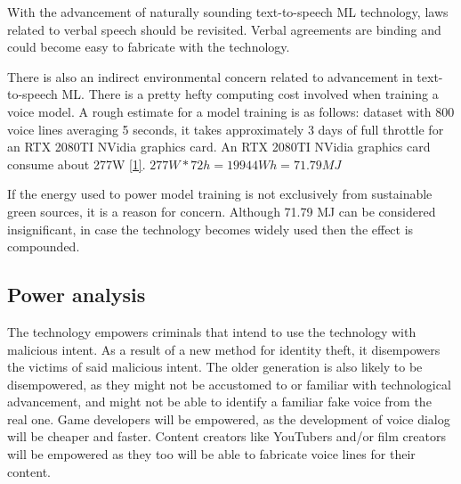 With the advancement of naturally sounding text-to-speech ML technology, laws related to verbal speech should be revisited.
Verbal agreements are binding and could become easy to fabricate with the technology.

There is also an indirect environmental concern related to advancement in text-to-speech ML. There is a pretty hefty computing cost involved when training a voice model. 
A rough estimate for a model training is as follows: dataset with 800 voice lines averaging 5 seconds, it takes approximately 3 days of full throttle for an RTX 2080TI NVidia graphics card. 
An RTX 2080TI NVidia graphics card consume about 277W \href{https://www.tomshardware.com/reviews/nvidia-geforce-rtx-2080-ti-founders-edition,5805-10.html}{[1]}.
$ 277W*72h = 19944 Wh = 71.79 MJ $

If the energy used to power model training is not exclusively from sustainable green sources, it is a reason for concern. 
Although 71.79 MJ can be considered insignificant, in case the technology becomes widely used then the effect is compounded.

\subsection*{Power analysis}
The technology empowers criminals that intend to use the technology with malicious intent.
As a result of a new method for identity theft, it disempowers the victims of said malicious intent.
The older generation is also likely to be disempowered, as they might not be accustomed to or familiar with technological advancement, and might not be able to identify a familiar fake voice from the real one. 
Game developers will be empowered, as the development of voice dialog will be cheaper and faster.
Content creators like YouTubers and/or film creators will be empowered as they too will be able to fabricate voice lines for their content.

